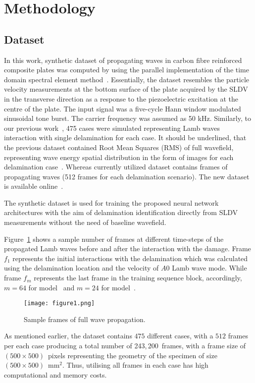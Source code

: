 \section{Methodology}
\subsection{Dataset}
In this work, synthetic dataset of propagating waves in carbon fibre reinforced composite plates was computed by using the parallel implementation of the time domain spectral element method~\cite{Kudela2020}. 
Essentially, the dataset resembles the particle velocity measurements at the bottom surface of the plate acquired by the SLDV in the transverse direction as a response to the piezoelectric excitation at the centre of the plate. 
The input signal was a five-cycle Hann window modulated sinusoidal tone burst. The carrier frequency was assumed as 50 kHz. 
Similarly, to our previous work~\cite{Ijjeh2021}, 475 cases were simulated representing Lamb waves interaction with single delamination for each case. 
It should be underlined, that the previous dataset contained Root Mean Squares (RMS) of full wavefield, representing wave energy spatial distribution in the form of images for each delamination case~\cite{Kudela2020d}. 
Whereas currently utilized dataset contains frames of propagating waves (512 frames for each delamination scenario). 
The new dataset is available online~\cite{kudela_pawel_2021_5414555}.

The synthetic dataset is used for training the proposed neural network architectures with the aim of delamination identification directly from SLDV measurements without the need of baseline wavefield.

Figure~\ref{fig:Full_wave} shows a sample number of frames at different time-steps of the propagated Lamb waves before and after the interaction with the damage.
Frame \(f_{1}\) represents the initial interactions with the delamination which was calculated using the delamination location and the velocity of \(A0\) Lamb wave mode.
While frame \(f_{m}\) represents the last frame in the training sequence block, accordingly, \(m=64\) for model~ and \(m=24\) for model~.
\begin{figure}[!h]
	\centering
	\texttt{[image: figure1.png]}
	\caption{Sample frames of full wave propagation.}
	\label{fig:Full_wave}
\end{figure}

As mentioned earlier, the dataset contains \(475\) different cases, with a \(512\) frames per each case producing a total number of 243,\,200~frames, with a frame size of \((500\times500)\)~pixels representing the geometry of the specimen of size \((500\times500)\)~mm\(^{2}\).
Thus, utilising all frames in each case has high computational and memory costs.

